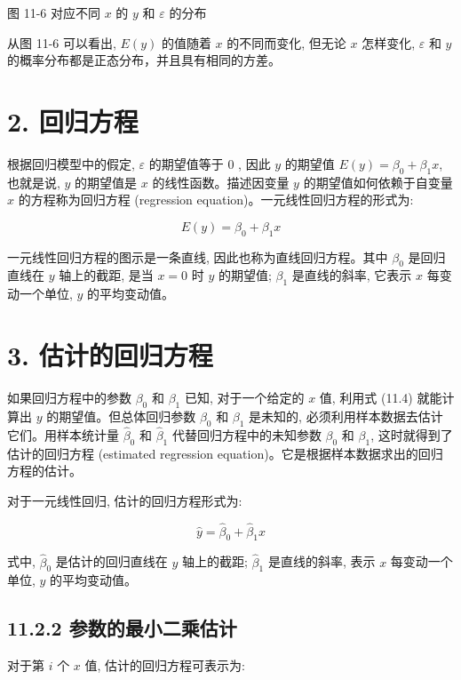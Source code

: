 \documentclass[10pt]{article}
\begin{document}
\begin{CJK*}{UTF8}{bsmi}
\begin{center}
\end{center}

图 11-6 对应不同 $x$ 的 $y$ 和 $\varepsilon$ 的分布

从图 11-6 可以看出, $E(y)$ 的值随着 $x$ 的不同而变化, 但无论 $x$ 怎样变化, $\varepsilon$ 和 $y$的概率分布都是正态分布，并且具有相同的方差。

\section*{2. 回归方程}
根据回归模型中的假定, $\varepsilon$ 的期望值等于 0 , 因此 $y$ 的期望值 $E(y)=\beta_{0}+\beta_{1} x$, 也就是说, $y$ 的期望值是 $x$ 的线性函数。描述因变量 $y$ 的期望值如何依赖于自变量 $x$ 的方程称为回归方程 (regression equation)。一元线性回归方程的形式为:


\begin{equation*}
E(y)=\beta_{0}+\beta_{1} x \tag{11.4}
\end{equation*}


一元线性回归方程的图示是一条直线, 因此也称为直线回归方程。其中 $\beta_{0}$ 是回归直线在 $y$ 轴上的截距, 是当 $x=0$ 时 $y$ 的期望值; $\beta_{1}$ 是直线的斜率, 它表示 $x$ 每变动一个单位, $y$ 的平均变动值。

\section*{3. 估计的回归方程}
如果回归方程中的参数 $\beta_{0}$ 和 $\beta_{1}$ 已知, 对于一个给定的 $x$ 值, 利用式 (11.4) 就能计算出 $y$ 的期望值。但总体回归参数 $\beta_{0}$ 和 $\beta_{1}$ 是未知的, 必须利用样本数据去估计它们。用样本统计量 $\hat{\beta}_{0}$ 和 $\hat{\beta}_{1}$ 代替回归方程中的未知参数 $\beta_{0}$ 和 $\beta_{1}$, 这时就得到了估计的回归方程 (estimated regression equation)。它是根据样本数据求出的回归方程的估计。

对于一元线性回归, 估计的回归方程形式为:


\begin{equation*}
\hat{y}=\hat{\beta}_{0}+\hat{\beta}_{1} x \tag{11.5}
\end{equation*}


式中, $\hat{\beta}_{0}$ 是估计的回归直线在 $y$ 轴上的截距; $\hat{\beta}_{1}$ 是直线的斜率, 表示 $x$ 每变动一个单位, $y$ 的平均变动值。

\subsection*{11.2.2 参数的最小二乘估计}
对于第 $i$ 个 $x$ 值, 估计的回归方程可表示为:



\end{CJK*}
\end{document}
